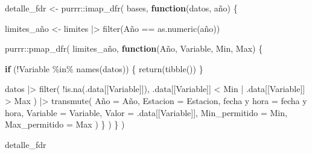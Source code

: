 \documentclass[
  letterpaper,
  DIV=11,
  numbers=noendperiod]{scrartcl}
\newenvironment{Shaded}{\begin{snugshade}}{\end{snugshade}}
\newcommand{\AttributeTok}[1]{\textcolor[rgb]{0.40,0.45,0.13}{#1}}
\newcommand{\ControlFlowTok}[1]{\textcolor[rgb]{0.00,0.23,0.31}{\textbf{#1}}}
\newcommand{\FunctionTok}[1]{\textcolor[rgb]{0.28,0.35,0.67}{#1}}
\newcommand{\NormalTok}[1]{\textcolor[rgb]{0.00,0.23,0.31}{#1}}
\newcommand{\OtherTok}[1]{\textcolor[rgb]{0.00,0.23,0.31}{#1}}
\newcommand{\SpecialCharTok}[1]{\textcolor[rgb]{0.37,0.37,0.37}{#1}}
\newcommand{\StringTok}[1]{\textcolor[rgb]{0.13,0.47,0.30}{#1}}
\begin{document}
\begin{Shaded}
\begin{Highlighting}[]
\NormalTok{detalle\_fdr }\OtherTok{\textless{}{-}}\NormalTok{ purrr}\SpecialCharTok{::}\FunctionTok{imap\_dfr}\NormalTok{(}
\NormalTok{  bases,}
  \ControlFlowTok{function}\NormalTok{(datos, año) \{}

\NormalTok{    limites\_año }\OtherTok{\textless{}{-}}\NormalTok{ limites }\SpecialCharTok{|\textgreater{}}
      \FunctionTok{filter}\NormalTok{(Año }\SpecialCharTok{==} \FunctionTok{as.numeric}\NormalTok{(año))}

\NormalTok{    purrr}\SpecialCharTok{::}\FunctionTok{pmap\_dfr}\NormalTok{(}
\NormalTok{      limites\_año,}
      \ControlFlowTok{function}\NormalTok{(Año, Variable, Min, Max) \{}

        \ControlFlowTok{if}\NormalTok{ (}\SpecialCharTok{!}\NormalTok{Variable }\SpecialCharTok{\%in\%} \FunctionTok{names}\NormalTok{(datos)) \{}
          \FunctionTok{return}\NormalTok{(}\FunctionTok{tibble}\NormalTok{())}
\NormalTok{        \}}

\NormalTok{        datos }\SpecialCharTok{|\textgreater{}}
          \FunctionTok{filter}\NormalTok{(}
            \SpecialCharTok{!}\FunctionTok{is.na}\NormalTok{(.data[[Variable]]),}
\NormalTok{            .data[[Variable]] }\SpecialCharTok{\textless{}}\NormalTok{ Min }\SpecialCharTok{|}
\NormalTok{              .data[[Variable]] }\SpecialCharTok{\textgreater{}}\NormalTok{ Max}
\NormalTok{          ) }\SpecialCharTok{|\textgreater{}}
          \FunctionTok{transmute}\NormalTok{(}
\NormalTok{            Año }\OtherTok{=}\NormalTok{ Año,}
            \AttributeTok{Estacion =}\NormalTok{ Estacion,}
            \StringTok{\textasciigrave{}}\AttributeTok{fecha y hora}\StringTok{\textasciigrave{}} \OtherTok{=} \StringTok{\textasciigrave{}}\AttributeTok{fecha y hora}\StringTok{\textasciigrave{}}\NormalTok{,}
            \AttributeTok{Variable =}\NormalTok{ Variable,}
            \AttributeTok{Valor =}\NormalTok{ .data[[Variable]],}
            \AttributeTok{Min\_permitido =}\NormalTok{ Min,}
            \AttributeTok{Max\_permitido =}\NormalTok{ Max}
\NormalTok{          )}
\NormalTok{      \}}
\NormalTok{    )}
\NormalTok{  \}}
\NormalTok{)}

\NormalTok{detalle\_fdr}
\end{Highlighting}
\end{Shaded}
\end{document}
